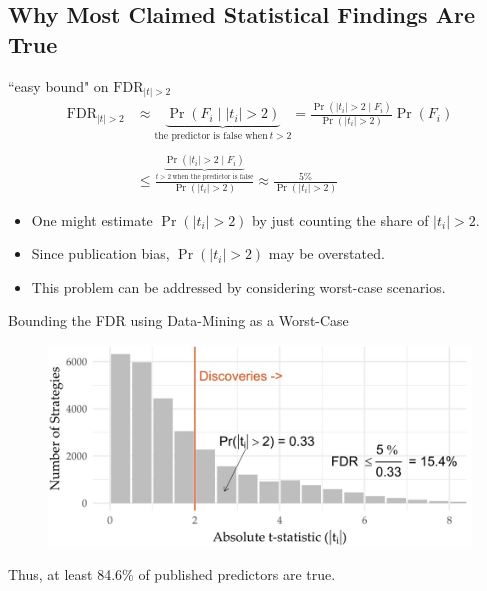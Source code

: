 \documentclass[UTF8, 16pt]{beamer}
\begin{document}
\begin{CJK*}{UTF8}{gbsn}
\section{Why Most Claimed Statistical Findings Are True}
\begin{frame}{``easy bound" on $\mathrm{FDR}_{|t|>2}$}
	$$
	\begin{aligned} 
		\mathrm{FDR}_{|t|>2} 
		& \approx \underbrace{\operatorname{Pr}\left(F_{i}\mid |t_{i}|>2\right)}_{\text{the predictor is false when}\ t>2}
		 = \frac{
		{
		\operatorname{Pr}\left(\left|t_{i}\right|>2 \mid F_{i}\right)}
		}
		{
		\operatorname{Pr}\left(\left|t_{i}\right|>2\right)
		} 
		\operatorname{Pr}\left(F_{i}\right) 
		\\ \ \\
		& \leq 
		\frac{
		\underbrace{\operatorname{Pr}\left(\left|t_{i}\right|>2 \mid F_{i}\right)}_{t>2 \ \text{when the predictor is false}}
		}{\operatorname{Pr}\left(\left|t_{i}\right|>2\right)}  
		 \approx \frac{5 \%}
		{\operatorname{Pr}\left(\left|t_{i}\right|>2\right)}
	\end{aligned}
	$$
	\begin{itemize}
		\item One might estimate $\operatorname{Pr}\left(\left|t_{i}\right|>2\right)$ by just counting the share of $|t_i|>2$.
		\item Since publication bias, $\operatorname{Pr}\left(\left|t_{i}\right|>2\right)$ may be overstated.
		\item This problem can be addressed by considering \alert{worst-case scenarios}.
	\end{itemize}
\end{frame}

\begin{frame}{Bounding the FDR using Data-Mining as a Worst-Case}
	\begin{figure}[htpb]
  		\begin{center}
    	\includegraphics[width=0.9 \linewidth]
    	{pic/Data-Mining.jpg}
  		\end{center}
	\end{figure}
	\begin{center}
		Thus, at least 84.6\% of published predictors are true.
	\end{center}
\end{frame}


\end{CJK*}
\end{document}
